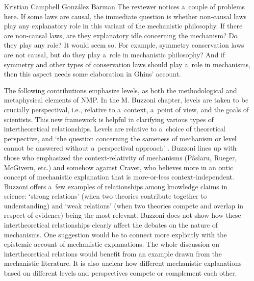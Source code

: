 \begin{recengenv}{Kristian Campbell González Barman}
\enlargethispage{1.5\baselineskip}
The reviewer notices a~couple of problems here. If some laws are causal, the immediate question is whether non-causal laws play any explanatory role in this variant of the mechanistic philosophy. If there are non-causal laws, are they explanatory idle concerning the mechanism? Do they play any role? It would seem so. For example, symmetry conservation laws are not causal, but do they play a~role in mechanistic philosophy? And if symmetry and other types of conservation laws should play a~role in mechanisms, then this aspect needs some elaboration in Ghins' account.

The following contributions emphasize levels, as both the methodological and metaphysical elements of NMP. In the M. Buzzoni chapter, levels are taken to be crucially perspectival, i.e., relative to a~context, a~point of view, and the goals of scientists. This new framework is helpful in clarifying various types of intertheoretical relationships. Levels are relative to a~choice of theoretical perspective, and ‘the question concerning the sameness of mechanism or level cannot be answered without a~perspectival approach'
\parencite*[][p.118]{falkenburg_mechanistic_2019}. %
 Buzzoni lines up with those who emphasized the context-relativity of mechanisms (Pâslaru, Rueger, McGivern, etc.) and somehow against Craver, who believes more in an ontic concept of mechanistic explanation that is more-or-less context-independent. Buzzoni offers a~few examples of relationships among knowledge claims in science: ‘strong relations' (when two theories contribute together to understanding) and ‘weak relations' (when two theories compete and overlap in respect of evidence) being the most relevant. Buzzoni does not show how these intertheoretical relationships clearly affect the debates on the nature of mechanisms. One suggestion would be to connect more explicitly with the epistemic account of mechanistic explanations. The whole discussion on intertheoretical relations would benefit from an example drawn from the mechanistic literature. It is also unclear how different mechanistic explanations based on different levels and perspectives compete or complement each other.


\end{recengenv}
